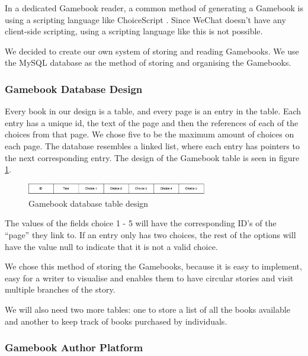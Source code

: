 In a dedicated Gamebook reader, a common method of generating a Gamebook is using a scripting language like ChoiceScript \cite{LLC}. Since WeChat doesn't have any client-side scripting, using a scripting language like this is not possible. 

We decided to create our own system of storing and reading Gamebooks. We use the MySQL database as the method of storing and organising the Gamebooks.

\subsubsection{Gamebook Database Design}

Every book in our design is a table, and every page is an entry in the table. Each entry has a unique id, the text of the page and then the references of each of the choices from that page. We chose five to be the maximum amount of choices on each page. The database resembles a linked list, where each entry has pointers to the next corresponding entry. The design of the Gamebook table is seen in figure \ref{fig:gamebook_database}.

\begin{figure}
  \centering
    \caption{Gamebook database table design} 
    \includegraphics[width=0.7\textwidth]{figs/Gamebook_Database.pdf}
   
   \label{fig:gamebook_database}
\end{figure}

The values of the fields choice 1 - 5 will have the corresponding ID's of the ``page'' they link to. If an entry only has two choices, the rest of the options will have the value null to indicate that it is not a valid choice.

We chose this method of storing the Gamebooks, because it is easy to implement, easy for a writer to visualise and enables them to have circular stories and visit multiple branches of the story. 

We will also need two more tables: one to store a list of all the books available and another to keep track of books purchased by individuals. 

\subsubsection{Gamebook Author Platform}

